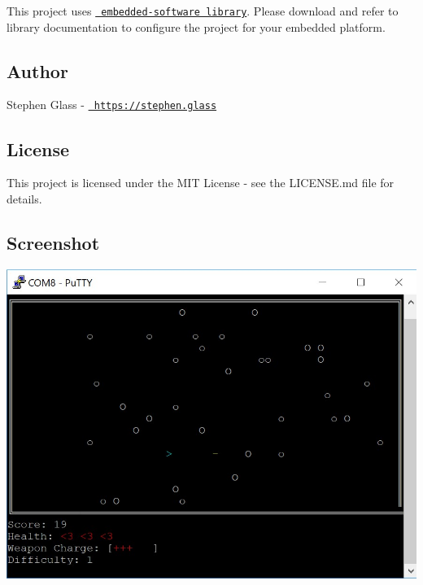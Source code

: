 This project uses \href{https://github.com/muhlbaier/embedded-software}{\texttt{ embedded-\/software library}}. Please download and refer to library documentation to configure the project for your embedded platform.

\subsection*{Author}


\begin{DoxyItemize}
\item Stephen Glass -\/ \href{https://stephen.glass}{\texttt{ https\+://stephen.\+glass}}
\end{DoxyItemize}

\subsection*{License}

This project is licensed under the M\+IT License -\/ see the L\+I\+C\+E\+N\+SE.md file for details.

\subsection*{Screenshot}


\begin{DoxyImage}
\includegraphics[width=\textwidth,height=\textheight/2,keepaspectratio=true]{screenshot.jpg}
\end{DoxyImage}
